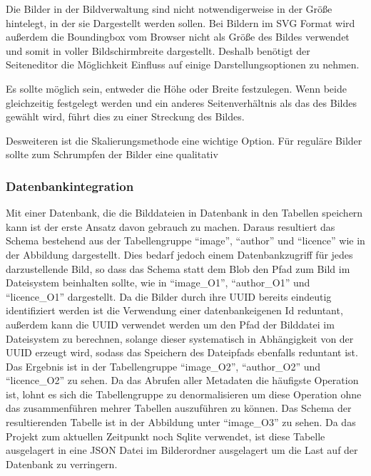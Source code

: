 Die Bilder in der Bildverwaltung sind nicht notwendigerweise in der Größe
hintelegt, in der sie Dargestellt werden sollen. Bei Bildern im SVG Format
wird außerdem die Boundingbox vom Browser nicht als Größe des Bildes verwendet
und somit in voller Bildschirmbreite dargestellt. Deshalb benötigt der
Seiteneditor die Möglichkeit Einfluss auf einige Darstellungsoptionen zu nehmen.

Es sollte möglich sein, entweder die Höhe oder Breite festzulegen. Wenn beide
gleichzeitig festgelegt werden und ein anderes Seitenverhältnis als das des
Bildes gewählt wird, führt dies zu einer Streckung des Bildes.

Desweiteren ist die Skalierungsmethode eine wichtige Option. Für reguläre Bilder
sollte zum Schrumpfen der Bilder eine qualitativ 

\subsubsection{Datenbankintegration}


Mit einer Datenbank, die die Bilddateien in Datenbank in den Tabellen speichern
kann ist der erste Ansatz davon gebrauch zu machen. Daraus resultiert das Schema
bestehend aus der Tabellengruppe ``image'', ``author'' und ``licence'' wie in
der Abbildung dargestellt. Dies bedarf jedoch einem Datenbankzugriff für jedes
darzustellende Bild, so dass das Schema statt dem Blob den Pfad zum Bild im
Dateisystem beinhalten sollte, wie in ``image\_O1'', ``author\_O1'' und
``licence\_O1'' dargestellt. Da die Bilder durch ihre UUID bereits eindeutig
identifiziert werden ist die Verwendung einer datenbankeigenen Id reduntant,
außerdem kann die UUID verwendet werden um den Pfad der Bilddatei im Dateisystem
zu berechnen, solange dieser systematisch in Abhängigkeit von der UUID erzeugt
wird, sodass das Speichern des Dateipfads ebenfalls reduntant ist. Das Ergebnis
ist in der Tabellengruppe ``image\_O2'', ``author\_O2'' und ``licence\_O2'' zu
sehen. Da das Abrufen aller Metadaten die häufigste Operation ist, lohnt es sich
die Tabellengruppe zu denormalisieren um diese Operation ohne das zusammenführen
mehrer Tabellen auszuführen zu können. Das Schema der resultierenden Tabelle ist
in der Abbildung unter ``image\_O3'' zu sehen. Da das Projekt zum aktuellen
Zeitpunkt noch Sqlite verwendet, ist diese Tabelle ausgelagert in eine JSON
Datei im Bilderordner ausgelagert um die Last auf der Datenbank zu verringern.


